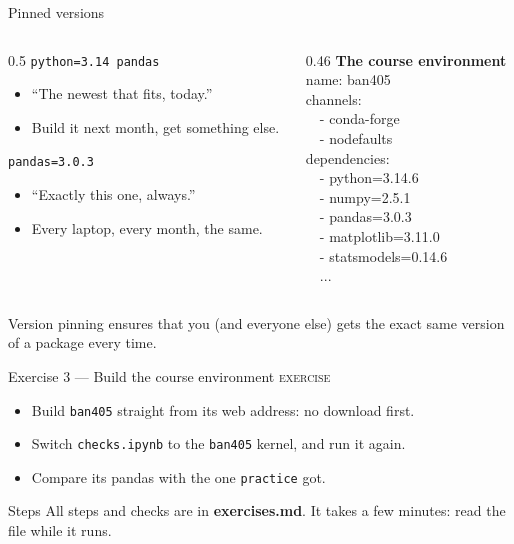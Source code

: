 \documentclass[aspectratio=169,11pt]{beamer}
\newcommand{\code}[1]{\texttt{#1}}
\newcommand{\key}[1]{\textbf{\textcolor{ban}{#1}}}
\newcommand{\exerciseframe}[3]{%
  \begin{frame}[t]{#1}
    \vspace{0.4em}
    {\small\textcolor{softgray}{\textsc{exercise}}}\par\vspace{0.6em}
    #2
    \vfill
    \begin{block}{Steps}
      All steps and checks are in \key{exercises.md}. #3
    \end{block}
    \vspace{0.6em}
  \end{frame}}
\begin{document}
\begin{frame}{Pinned versions}
  \begin{columns}[T]
    \begin{column}{0.5\textwidth}
      \code{python=3.14 pandas}
      \begin{itemize}
        \item ``The newest that fits, today.''
        \item Build it next month, get something else.
      \end{itemize}
      \vspace{0.6em}
      \code{pandas=3.0.3}
      \begin{itemize}
        \item ``Exactly this one, always.''
        \item Every laptop, every month, the same.
      \end{itemize}
    \end{column}
    \begin{column}{0.46\textwidth}
      \textbf{The course environment}\\[0.3em]
      \ttfamily\footnotesize
      name: ban405\\
      channels:\\
      \ \ - conda-forge\\
      \ \ - nodefaults\\
      dependencies:\\
      \ \ - python=3.14.6\\
      \ \ - numpy=2.5.1\\
      \ \ - pandas=3.0.3\\
      \ \ - matplotlib=3.11.0\\
      \ \ - statsmodels=0.14.6\\
      \ \ \textcolor{softgray}{...}
    \end{column}
  \end{columns}
  \vspace{0.8em}
  Version pinning ensures that you (and everyone else) gets the exact same version of a package every time.
\end{frame}

\exerciseframe{Exercise 3 --- Build the course environment}{%
  \begin{itemize}
    \item Build \code{ban405} straight from its web address: no download first.
    \item Switch \code{checks.ipynb} to the \code{ban405} kernel, and run it again.
    \item Compare its pandas with the one \code{practice} got.
  \end{itemize}}{It takes a few minutes: read the file while it runs.}
\end{document}
